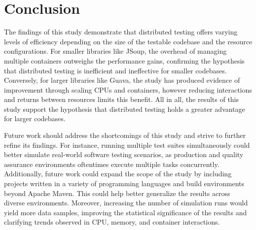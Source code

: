 \section{Conclusion}
\label{Conclusion}

The findings of this study demonstrate that distributed testing offers varying levels of efficiency depending on the size of the testable codebase and the resource configurations. For smaller libraries like JSoup, the overhead of managing multiple containers outweighs the performance gains, confirming the hypothesis that distributed testing is inefficient and ineffective for smaller codebases. Conversely, for larger libraries like Guava, the study has produced evidence of improvement through scaling CPUs and containers, however reducing interactions and returns between resources limits this benefit. All in all, the results of this study support the hypothesis that distributed testing holds a greater advantage for larger codebases.  

Future work should address the shortcomings of this study and strive to further refine its findings. For instance, running multiple test suites simultaneously could better simulate real-world software testing scenarios, as production and quality assurance environments oftentimes execute multiple tasks concurrently. Additionally, future work could expand the scope of the study by including projects written in a variety of programming languages and build environments beyond Apache Maven. This could help better generalize the results across diverse environments. Moreover, increasing the number of simulation runs would yield more data samples, improving the statistical significance of the results and clarifying trends observed in CPU, memory, and container interactions. 
